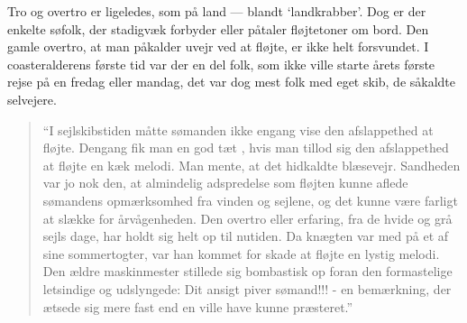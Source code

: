 Tro og overtro er ligeledes, som på land --- blandt `landkrabber'. Dog er
der enkelte søfolk, der stadigvæk forbyder eller påtaler fløjtetoner om
bord. Den gamle overtro, at man påkalder uvejr ved at fløjte, er ikke helt
forsvundet. I coasteralderens første tid var der en del folk, som ikke
ville starte årets første rejse på en fredag eller mandag, det var dog
mest folk med eget skib, de såkaldte selvejere. 

\begin{quote}
    ``I sejlskibstiden måtte sømanden ikke engang vise den afslappethed at
    fløjte. Dengang fik man en god tæt , hvis man tillod sig den afslappethed at fløjte en kæk melodi.
    Man mente, at det hidkaldte blæsevejr. Sandheden var jo nok den, at
    almindelig adspredelse som fløjten kunne aflede sømandens opmærksomhed fra
    vinden og sejlene, og det kunne være farligt at slække for årvågenheden.
    Den overtro eller erfaring, fra de hvide og grå sejls dage, har holdt sig
    helt op til nutiden. Da knægten var med på et af sine sommertogter, var
    han kommet for skade at fløjte en lystig melodi.  Den ældre maskinmester
    stillede sig bombastisk op foran den formastelige letsindige og
    udslyngede: Dit ansigt piver sømand!!! - en bemærkning, der ætsede sig
    mere fast end en  ville
    have kunne præsteret.''
\end{quote}

